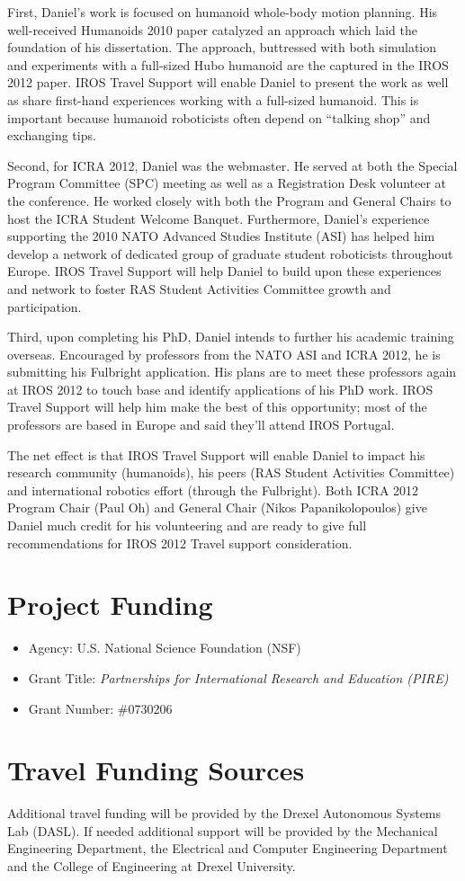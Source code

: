 \documentclass[11pt,a4paper,oneside]{report}
\begin{document}
First, Daniel's work is focused on humanoid whole-body motion planning.  His well-received Humanoids 2010 paper catalyzed an approach which laid the foundation of his dissertation.  The approach, buttressed with both simulation and experiments with a full-sized Hubo humanoid are the captured in the IROS 2012 paper.  IROS Travel Support will enable Daniel to present the work as well as share first-hand experiences working with a full-sized humanoid.  This is important because humanoid roboticists often depend on ``talking shop'' and exchanging tips.  

Second, for ICRA 2012, Daniel was the webmaster.  He served at both the Special Program Committee (SPC) meeting as well as a Registration Desk volunteer at the conference.  He worked closely with both the Program and General Chairs to host the ICRA Student Welcome Banquet.  Furthermore, Daniel's experience supporting the 2010 NATO Advanced Studies Institute (ASI) has helped him develop a network of dedicated group of graduate student roboticists throughout Europe.  IROS Travel Support will help Daniel to build upon these experiences and network to foster RAS Student Activities Committee growth and participation.

Third, upon completing his PhD, Daniel intends to further his academic training overseas.  Encouraged by professors from the NATO ASI and ICRA 2012, he is submitting his Fulbright application.  His plans are to meet these professors again at IROS 2012 to touch base and identify applications of his PhD work.  IROS Travel Support will help him make the best of this opportunity; most of the professors are based in Europe and said they'll attend IROS Portugal.  

The net effect is that IROS Travel Support will enable Daniel to impact his research community (humanoids), his peers (RAS Student Activities Committee) and international robotics effort (through the Fulbright).  Both ICRA 2012 Program Chair (Paul Oh) and General Chair (Nikos Papanikolopoulos) give Daniel much credit for his volunteering and are ready to give full recommendations for IROS 2012 Travel support consideration.


\section*{Project Funding}
\begin{itemize}
\item Agency: U.S. National Science Foundation (NSF)
\item Grant Title: \textit{Partnerships for International Research
and Education (PIRE)}
\item Grant Number: \#0730206
\end{itemize}

\section*{Travel Funding Sources}
Additional travel funding will be provided by the Drexel Autonomous Systems Lab (DASL).  If needed additional support will be provided by the Mechanical Engineering Department, the Electrical and Computer Engineering Department and the College of Engineering at Drexel University.
\end{document}
